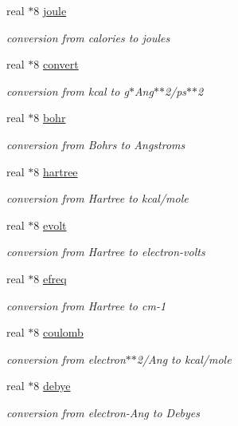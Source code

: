 \begin{DoxyCompactItemize}
real $\ast$8 \hyperlink{classunits_adba129a336ba3d922b44888a772d1202}{joule}
\begin{DoxyCompactList}\small\item\em conversion from calories to joules \end{DoxyCompactList}\item 
real $\ast$8 \hyperlink{classunits_a5faccb1252257c20c6e82f552be722e5}{convert}
\begin{DoxyCompactList}\small\item\em conversion from kcal to g$\ast$\-Ang$\ast$$\ast$2/ps$\ast$$\ast$2 \end{DoxyCompactList}\item 
real $\ast$8 \hyperlink{classunits_ae7c14cde165f2f0c1b888e68c66f97a3}{bohr}
\begin{DoxyCompactList}\small\item\em conversion from Bohrs to Angstroms \end{DoxyCompactList}\item 
real $\ast$8 \hyperlink{classunits_a2d2a41cc9d8db0f200ede07bbbf73196}{hartree}
\begin{DoxyCompactList}\small\item\em conversion from Hartree to kcal/mole \end{DoxyCompactList}\item 
real $\ast$8 \hyperlink{classunits_adb6bacb7ec9b35098eb6fc5976c13de7}{evolt}
\begin{DoxyCompactList}\small\item\em conversion from Hartree to electron-\/volts \end{DoxyCompactList}\item 
real $\ast$8 \hyperlink{classunits_aa5ef6c776d66106b2e1c4e0ed775ef04}{efreq}
\begin{DoxyCompactList}\small\item\em conversion from Hartree to cm-\/1 \end{DoxyCompactList}\item 
real $\ast$8 \hyperlink{classunits_a5989b95d691cf998bec4bc3774ffb951}{coulomb}
\begin{DoxyCompactList}\small\item\em conversion from electron$\ast$$\ast$2/\-Ang to kcal/mole \end{DoxyCompactList}\item 
real $\ast$8 \hyperlink{classunits_a5d28ba6adc7dbc95da97352f2b3c9216}{debye}
\begin{DoxyCompactList}\small\item\em conversion from electron-\/\-Ang to Debyes \end{DoxyCompactList}\item 

\end{DoxyCompactItemize}
